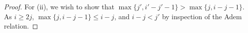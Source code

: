 \documentclass[10pt]{article}
\makeatletter
\newcommand{\produces}[3]{{#1}{#3}{#2}}
\renewcommand{\Q}{Q}
\newcommand{\minDim}{m}
\newcommand{\minDimP}{\overline{m}}
\renewcommand{\produces}[3]{
{
\def\labelstyle{\scriptstyle}
\xymatrix@C=2em@1{
{#1}
\ar@{-}[r]|-{{\,#3\,}}
&%
{#2}%
}}}
\makeatother
\begin{document}
\begin{SteenrodAlgebrasAndTheirKoszulDuals}
\begin{proof}
For (ii), we wish to show that $\max\{j',i'-j'-1\}>\max\{j,i-j-1\}$. 
As $i\geq2j$, $\max\{j,i-j-1\}\leq i-j$, and $i-j<j'$ by inspection of the Adem relation.
\end{proof}
%
%



\end{SteenrodAlgebrasAndTheirKoszulDuals}
\end{document}
